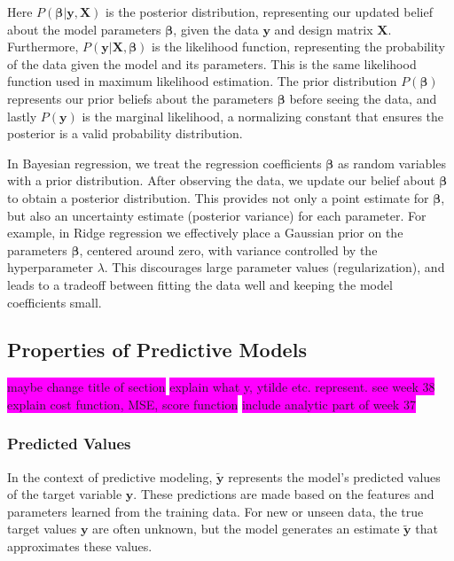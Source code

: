 \documentclass[aps,pra,english,notitlepage,reprint,nofootinbib]{revtex4-1}  %
\begin{document}
Here $P(\boldsymbol{\beta} | \mathbf{y}, \mathbf{X})$ is the posterior distribution, representing our updated belief about the model parameters $\boldsymbol{\beta}$, given the data $\mathbf{y}$ and design matrix $\mathbf{X}$. Furthermore, $P(\mathbf{y} | \mathbf{X}, \boldsymbol{\beta})$ is the likelihood function, representing the probability of the data given the model and its parameters. This is the same likelihood function used in maximum likelihood estimation. The prior distribution $P(\boldsymbol{\beta})$ represents our prior beliefs about the parameters $\boldsymbol{\beta}$ before seeing the data, and lastly $P(\mathbf{y})$ is the marginal likelihood, a normalizing constant that ensures the posterior is a valid probability distribution.

In Bayesian regression, we treat the regression coefficients $\boldsymbol{\beta}$ as random variables with a prior distribution. After observing the data, we update our belief about $\boldsymbol{\beta}$ to obtain a posterior distribution. This provides not only a point estimate for $\boldsymbol{\beta}$, but also an uncertainty estimate (posterior variance) for each parameter. For example, in Ridge regression we effectively place a Gaussian prior on the parameters $\boldsymbol{\beta}$, centered around zero, with variance controlled by the hyperparameter $\lambda$. This discourages large parameter values (regularization), and leads to a tradeoff between fitting the data well and keeping the model coefficients small.


\subsection{Properties of Predictive Models}\label{subsec:tradeoff}
\colorbox{magenta}{maybe change title of section}
\colorbox{magenta}{explain what y, ytilde etc. represent. see week 38}
\colorbox{magenta}{explain cost function, MSE, score function}
\colorbox{magenta}{include analytic part of week 37}

\subsubsection{Predicted Values}
In the context of predictive modeling, $\mathbf{\tilde{y}}$ represents the model's predicted values of the target variable $\mathbf{y}$. These predictions are made based on the features and parameters learned from the training data. For new or unseen data, the true target values $\mathbf{y}$ are often unknown, but the model generates an estimate $\mathbf{\tilde{y}}$ that approximates these values.
\end{document}
